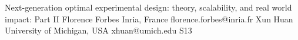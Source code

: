 \begin{session}
 {Next-generation optimal experimental design: theory, scalability, and real world impact: Part II}%
 {Florence Forbes}%
 {Inria, France}%
 {florence.forbes@inria.fr}%
 {Xun Huan}%
 {University of Michigan, USA}%
 {xhuan@umich.edu}%
 {S13}%
 {}%


\end{session}

